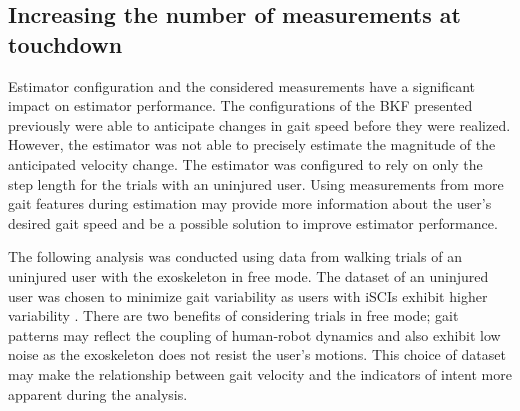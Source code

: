 
\subsection{Increasing the number of measurements at touchdown}\label{sec:increase_meas}
Estimator configuration and the considered measurements have a significant impact on estimator performance. The configurations of the BKF presented previously were able to anticipate changes in gait speed before they were realized. However, the estimator was not able to precisely estimate the magnitude of the anticipated velocity change. The estimator was configured to rely on only the step length for the trials with an uninjured user. Using measurements from more gait features during estimation may provide more information about the user's desired gait speed and be a possible solution to improve estimator performance.

The following analysis was conducted using data from walking trials of an uninjured user with the exoskeleton in free mode. The dataset of an uninjured user was chosen to minimize gait variability as users with iSCIs exhibit higher variability \cite{sohn2018variability}. There are two benefits of considering trials in free mode; gait patterns may reflect the coupling of human-robot dynamics and also exhibit low noise as the exoskeleton does not resist the user's motions. This choice of dataset may make the relationship between gait velocity and the indicators of intent more apparent during the analysis. 

